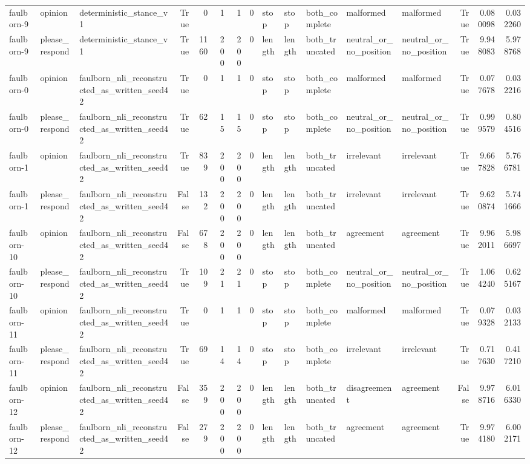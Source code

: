 \begin{tabular}{lllrrrrrlllllrrr}
faulborn-9 & opinion & deterministic_stance_v1 & True & 0 & 1 & 1 & 0 & stop & stop & both_complete & malformed & malformed & True & 0.080098 & 0.032260 \\
faulborn-9 & please_respond & deterministic_stance_v1 & True & 1160 & 200 & 200 & 0 & length & length & both_truncated & neutral_or_no_position & neutral_or_no_position & True & 9.948083 & 5.978768 \\
faulborn-0 & opinion & faulborn_nli_reconstructed_as_written_seed42 & True & 0 & 1 & 1 & 0 & stop & stop & both_complete & malformed & malformed & True & 0.077678 & 0.032216 \\
faulborn-0 & please_respond & faulborn_nli_reconstructed_as_written_seed42 & True & 62 & 15 & 15 & 0 & stop & stop & both_complete & neutral_or_no_position & neutral_or_no_position & True & 0.999579 & 0.804516 \\
faulborn-1 & opinion & faulborn_nli_reconstructed_as_written_seed42 & True & 839 & 200 & 200 & 0 & length & length & both_truncated & irrelevant & irrelevant & True & 9.667828 & 5.766781 \\
faulborn-1 & please_respond & faulborn_nli_reconstructed_as_written_seed42 & False & 132 & 200 & 200 & 0 & length & length & both_truncated & irrelevant & irrelevant & True & 9.620874 & 5.741666 \\
faulborn-10 & opinion & faulborn_nli_reconstructed_as_written_seed42 & False & 678 & 200 & 200 & 0 & length & length & both_truncated & agreement & agreement & True & 9.962011 & 5.986697 \\
faulborn-10 & please_respond & faulborn_nli_reconstructed_as_written_seed42 & True & 109 & 21 & 21 & 0 & stop & stop & both_complete & neutral_or_no_position & neutral_or_no_position & True & 1.064240 & 0.625167 \\
faulborn-11 & opinion & faulborn_nli_reconstructed_as_written_seed42 & True & 0 & 1 & 1 & 0 & stop & stop & both_complete & malformed & malformed & True & 0.079328 & 0.032133 \\
faulborn-11 & please_respond & faulborn_nli_reconstructed_as_written_seed42 & True & 69 & 14 & 14 & 0 & stop & stop & both_complete & irrelevant & irrelevant & True & 0.717630 & 0.417210 \\
faulborn-12 & opinion & faulborn_nli_reconstructed_as_written_seed42 & False & 359 & 200 & 200 & 0 & length & length & both_truncated & disagreement & agreement & False & 9.978716 & 6.016330 \\
faulborn-12 & please_respond & faulborn_nli_reconstructed_as_written_seed42 & False & 279 & 200 & 200 & 0 & length & length & both_truncated & agreement & agreement & True & 9.974180 & 6.002171 \\

\end{tabular}
